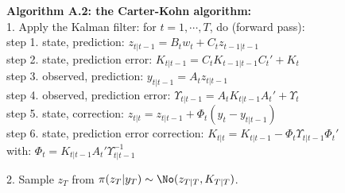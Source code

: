 \textbf{Algorithm A.2: the Carter-Kohn algorithm:} \vspace{3mm} \\
1. Apply the Kalman filter: for $t=1,\cdots,T$, do (forward pass): \\
\hspace*{4mm} step 1. state, prediction: \hspace{35mm} $z_{t|t-1}=B_t w_t+C_t z_{t-1|t-1}$ \vspace{0.5mm} \\
\hspace*{4mm} step 2. state, prediction error: \hspace{26mm} $K_{t|t-1}=C_t K_{t-1|t-1} C_t'+K_t$ \vspace{0.5mm} \\
\hspace*{4mm} step 3. observed, prediction: \hspace{29mm} $y_{t|t-1}=A_t z_{t|t-1}$ \vspace{0.5mm} \\
\hspace*{4mm} step 4. observed, prediction error: \hspace{19.5mm} $\Upsilon_{t|t-1}=A_t K_{t|t-1} A_t'+\Upsilon_{t}$ \vspace{0.5mm} \\
\hspace*{4mm} step 5. state, correction: \hspace{36mm} $z_{t|t}=z_{t|t-1}+\Phi_t (y_t-y_{t|t-1})$ \vspace{0.5mm} \\
\hspace*{4mm} step 6. state, prediction error correction: \hspace{8mm} $K_{t|t}=K_{t|t-1}-\Phi_t \Upsilon_{t|t-1} \Phi_t'$ \vspace{0.5mm} \\
\hspace*{4mm} with: $\Phi_t=K_{t|t-1} A_t' \Upsilon_{t|t-1}^{-1}$ \vspace{3mm}

2. Sample $z_T$ from $\pi(z_T|y_T) \sim \No (z_{T|T},K_{T|T})$. \vspace{3mm}

